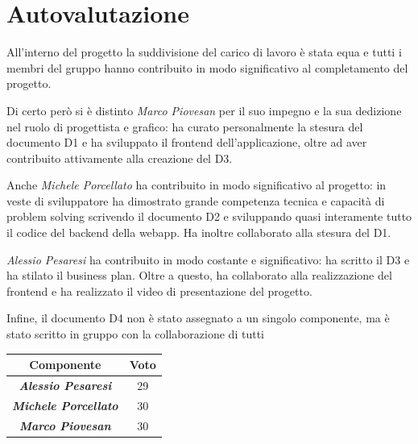 \section{Autovalutazione}

All’interno del progetto la suddivisione del carico di lavoro è stata equa e tutti i membri del gruppo hanno contribuito in modo significativo al completamento del progetto.

Di certo però si è distinto \textit{Marco Piovesan} per il suo impegno e la sua dedizione nel ruolo di progettista e grafico: ha curato personalmente la stesura del documento D1 e ha sviluppato il frontend dell'applicazione, oltre ad aver contribuito attivamente alla creazione del D3.

Anche \textit{Michele Porcellato} ha contribuito in modo significativo al progetto: in veste di sviluppatore ha dimostrato grande competenza tecnica e capacità di problem solving scrivendo il documento D2 e sviluppando quasi interamente tutto il codice del backend della webapp. Ha inoltre collaborato alla stesura del D1.

\textit{Alessio Pesaresi} ha contribuito in modo costante e significativo:  ha scritto il D3 e ha stilato il business plan. Oltre a questo, ha collaborato alla realizzazione del frontend e ha realizzato il video di presentazione del progetto.

Infine, il documento D4 non è stato assegnato a un singolo componente, ma è stato scritto in gruppo con la collaborazione di tutti

\begin{table}[H]
    \centering
    \begin{tabular}{|c|c|}
        \hline
        \textbf{Componente} & \textbf{Voto} \\
        \hline
        \textbf{\textit{Alessio Pesaresi}} & 29 \\
        \hline
        \textbf{\textit{Michele Porcellato}} & 30 \\
        \hline
        \textbf{\textit{Marco Piovesan}} & 30 \\
        \hline
    \end{tabular}
\end{table}